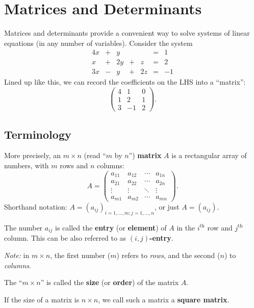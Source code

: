 \documentclass[
  12pt,
  oneside]{book}
\theoremstyle{definition}
\theoremstyle{definition}
\theoremstyle{definition}
\theoremstyle{definition}
\theoremstyle{remark}
\begin{document}
\chapter{Matrices and Determinants}\label{matrices-and-determinants}

Matrices and determinants provide a convenient way to solve systems of linear
equations (in any number of variables). Consider the system
\[
\begin{matrix}
    4x & + & y  &   &    & = & 1\\
    x  & + & 2y & + & z  & = & 2\\
    3x & - & y  & + & 2z & = & -1
\end{matrix}
\]
Lined up like this, we can record the coefficients on the LHS into a ``matrix'':
\[
\begin{pmatrix}
    4 & 1 & 0\\ 1 & 2 & 1 \\ 3 & -1 & 2
\end{pmatrix}.
\]

\section{Terminology}\label{terminology}

More precisely, an \(m\times n\) (read ``\(m\) by \(n\)'') \textbf{matrix} \(A\) is a rectangular array of numbers, with \(m\) rows and \(n\) columns:
\[
A = \begin{pmatrix}
    a_{11} & a_{12} & \cdots & a_{1n}\\
    a_{21} & a_{22} & \cdots & a_{2n}\\
    \vdots & \vdots & \ddots & \vdots \\
    a_{m1} & a_{m2} & \cdots & a_{mn}
\end{pmatrix}.
\]
Shorthand notation: \(A=(a_{ij})_{i=1,\dots,m; j=1,\dots,n}\), or just \(A=(a_{ij})\).

The number \(a_{ij}\) is called the \textbf{entry} (or \textbf{element}) of \(A\) in the \(i^\text{th}\) row and \(j^\text{th}\) column. This can be also referred to as \textbf{\((i,j)\)-entry}.

\emph{Note:} in \(m\times n\), the first number (\(m\)) refers to \emph{rows}, and the second (\(n\)) to \emph{columns}.

The ``\(m \times n\)'' is called the \textbf{size} (or \textbf{order}) of the matrix \(A\).

If the size of a matrix is \(n\times n\), we call such a matrix a \textbf{square matrix}.
\end{document}
